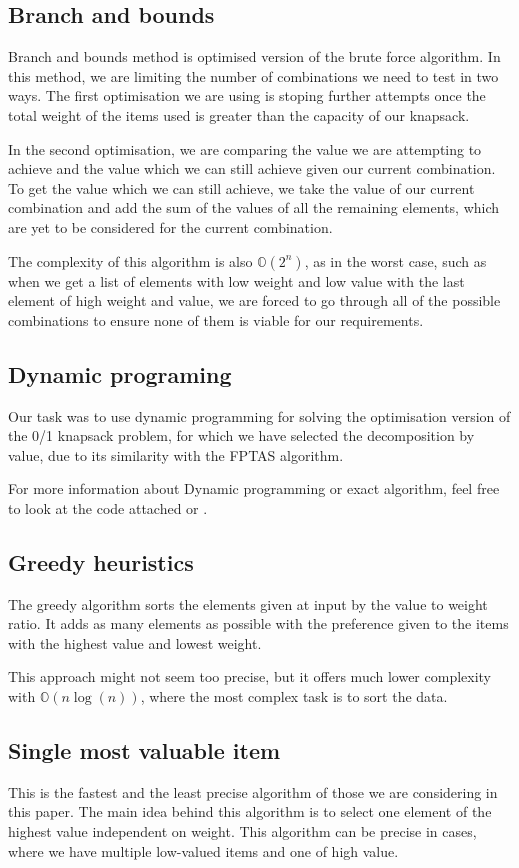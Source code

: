 \subsection{Branch and bounds}
Branch and bounds method is optimised version of the brute force algorithm.
In this method, we are limiting the number of combinations we need to test
in two ways. The first optimisation we are using is stoping further attempts
once the total weight of the items used is greater than the capacity of our
knapsack.

In the second optimisation, we are comparing the value we are attempting
to achieve and the value which we can still achieve given our current
combination. To get the value which we can still achieve, we take the
value of our current combination and add the sum of the values of all
the remaining elements, which are yet to be considered for the current
combination.

The complexity of this algorithm is also $\mathbb{O}(2^n)$, as in the
worst case, such as when we get a list of elements with low weight and
low value with the last element of high weight and value, we are forced
to go through all of the possible combinations to ensure none of them is
viable for our requirements.


\subsection{Dynamic programing}
Our task was to use dynamic programming for solving the optimisation version of the 0/1 knapsack
problem, for which we have selected the decomposition by value, due to its similarity with the
FPTAS algorithm.

For more information about Dynamic programming or exact algorithm, feel free to look at the code
attached or \cite[Moodle textbook]{WEBSITE:dynamicKnapsack}.

\subsection{Greedy heuristics}
The greedy algorithm sorts the elements given at input by the value to weight ratio. It adds as many
elements as possible with the preference given to the items with the highest value and lowest weight.

This approach might not seem too precise, but it offers much lower complexity with $\mathbb{O}(n \log(n))$,
where the most complex task is to sort the data.

\subsection{Single most valuable item}
This is the fastest and the least precise algorithm of those we are considering in this paper.
The main idea behind this algorithm is to select one element of the highest value independent
on weight. This algorithm can be precise in cases, where we have multiple low-valued items and one of high value.

